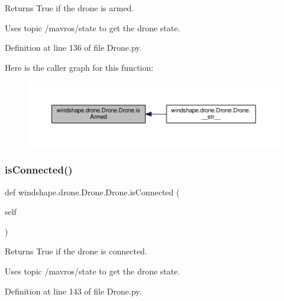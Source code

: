 \begin{DoxyVerb}Returns True if the drone is armed.

Uses topic /mavros/state to get the drone state.
\end{DoxyVerb}
 

Definition at line 136 of file Drone.\+py.

Here is the caller graph for this function\+:\nopagebreak
\begin{figure}[H]
\begin{center}
\leavevmode
\includegraphics[width=350pt]{classwindshape_1_1drone_1_1_drone_1_1_drone_a161d7774319e5de5dd7f13f5c66b64a3_icgraph}
\end{center}
\end{figure}
\mbox{\label{classwindshape_1_1drone_1_1_drone_1_1_drone_a0d6c9c56fd735733f4a2268896c30d37}} 
\subsubsection{\texorpdfstring{is\+Connected()}{isConnected()}}
{\footnotesize\ttfamily def windshape.\+drone.\+Drone.\+Drone.\+is\+Connected (\begin{DoxyParamCaption}\item[{}]{self }\end{DoxyParamCaption})}

\begin{DoxyVerb}Returns True if the drone is connected.

Uses topic /mavros/state to get the drone state.
\end{DoxyVerb}
 

Definition at line 143 of file Drone.\+py.


